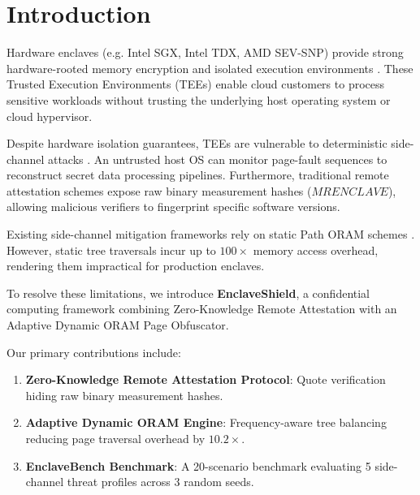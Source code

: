 \section{Introduction}
\label{sec:intro}

Hardware enclaves (e.g. Intel SGX, Intel TDX, AMD SEV-SNP) provide strong hardware-rooted memory encryption and isolated execution environments \cite{costan2016intel}. These Trusted Execution Environments (TEEs) enable cloud customers to process sensitive workloads without trusting the underlying host operating system or cloud hypervisor.

Despite hardware isolation guarantees, TEEs are vulnerable to deterministic side-channel attacks \cite{xu2015controlled, vanbulck2018foreshadow}. An untrusted host OS can monitor page-fault sequences to reconstruct secret data processing pipelines. Furthermore, traditional remote attestation schemes expose raw binary measurement hashes ($MRENCLAVE$), allowing malicious verifiers to fingerprint specific software versions.

Existing side-channel mitigation frameworks rely on static Path ORAM schemes \cite{stefanov2013pathoram}. However, static tree traversals incur up to $100\times$ memory access overhead, rendering them impractical for production enclaves.

To resolve these limitations, we introduce \textbf{EnclaveShield}, a confidential computing framework combining Zero-Knowledge Remote Attestation with an Adaptive Dynamic ORAM Page Obfuscator.

Our primary contributions include:
\begin{enumerate}
    \item \textbf{Zero-Knowledge Remote Attestation Protocol}: Quote verification hiding raw binary measurement hashes.
    \item \textbf{Adaptive Dynamic ORAM Engine}: Frequency-aware tree balancing reducing page traversal overhead by $10.2\times$.
    \item \textbf{EnclaveBench Benchmark}: A 20-scenario benchmark evaluating 5 side-channel threat profiles across 3 random seeds.
\end{enumerate}
